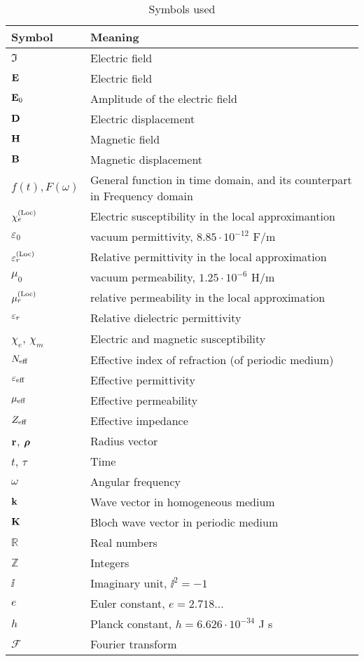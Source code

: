 \begin{table}[ht]   \caption{Symbols used}  \label{tb_symbols} \centering %
\begin{tabular}{ll}
 \toprule
Symbol & Meaning	\\
 \hline
$\Im$ 		& Electric field\\
$\mathbf{E}$ 		& Electric field\\
$\mathbf{E}_0$ 		& Amplitude of the electric field\\
$\mathbf{D}$ 		& Electric displacement\\
$\mathbf{H}$ 		& Magnetic field\\
$\mathbf{B}$ 		& Magnetic displacement\\
$f(t), F(\omega)$ & General function in time domain, and its counterpart in Frequency domain \\
$\chi_e^{\rm(Loc)}$ & Electric susceptibility in the local approximantion \\
$\varepsilon_0$ &vacuum permittivity, $8.85\cdot10^{-12}$ F/m\\
$\varepsilon^{\rm(Loc)}_r$ &Relative permittivity in the local approximation\\
$\mu_0$		&vacuum permeability, $1.25\cdot10^{-6}$ H/m \\
$\mu^{\rm(Loc)}_r$ &relative permeability in the local approximation\\

${\varepsilon_r}$ 	& Relative dielectric permittivity\\
$\chi_e$, $\chi_m$ 	& Electric and magnetic susceptibility\\
$N_{\text{eff} }$ 	& Effective index of refraction (of periodic medium)\\
$\varepsilon_{\text{eff} }$ 	& Effective permittivity\\
$\mu_{\text{eff} }$ 	& Effective permeability\\
$Z_{\text{eff} }$ 	& Effective impedance\\
${\mathbf{r}}$, $\boldsymbol{\rho}$ 		& Radius vector\\
$t$, $\tau$ 		& Time\\
$\omega$ 	& Angular frequency\\
${\mathbf{k}}$ 		& Wave vector in homogeneous medium\\
${\mathbf{K}}$ 		& Bloch wave vector in periodic medium\\

$\mathbb{R}$		& Real numbers\\
$\mathbb{Z}$		& Integers\\
$\ii$		& Imaginary unit, $\ii^2 = -1$\\
$e$ 		& Euler constant, $e = 2.718\ldots$\\
$h$ 		& Planck constant, $h = 6.626\cdot 10^{-34}$ J s\\
$\mathcal F$ 		& Fourier transform\\

 \bottomrule
 \end{tabular} \end{table}

